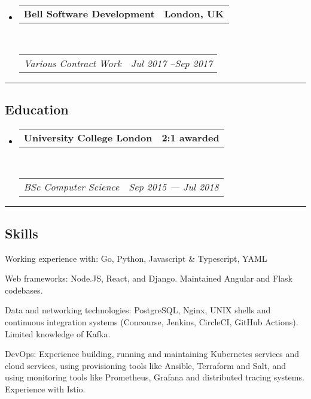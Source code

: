 \documentclass[11pt,a4paper]{article}
\makeatletter
\newenvironment{indentsection}[1]%
{\begin{list}{}%
	{\setlength{\leftmargin}{#1}}%
	\item[]%
}
{\end{list}}
\newenvironment{unindentsection}[1]%
{\begin{list}{}%
	{\setlength{\leftmargin}{-#1}}%
	\item[]%
}
{\end{list}}
\newcommand{\headerrow}[2]
{\begin{tabular*}{\linewidth}{l@{\extracolsep{\fill}}r}
	#1 &
	#2 \\
\end{tabular*}}
\makeatother
\begin{document}
\begin{unindentsection}{1.5em}
\begin{itemize}
 	\item
 	\headerrow%
 		{\textbf{Bell Software Development}}
		{\textbf{London, UK}}
 	\\
 	\headerrow%
 		{\emph{Various Contract Work}}
 		{\emph{Jul 2017 --Sep 2017}}
 \end{itemize}
\end{unindentsection}


 \vspace{-0.4em}
 \hrule
 \vspace{-1.2em}
 \subsection*{Education}

\begin{unindentsection}{1.5em}
\begin{itemize}
	\parskip=0.1em

	\item
	\headerrow%
		{\textbf{University College London}}
		{\textbf{2:1 awarded}}\\
	\headerrow%
		{\emph{BSc Computer Science}}
		{\emph{Sep 2015 --- Jul 2018}}

\end{itemize}
\end{unindentsection}

\vspace{-0.4em}
\hrule
\vspace{-1.2em}

\subsection*{Skills}

\begin{indentsection}{\parindent}
\begin{description*}
	\item[Working experience with:]
	    Go, Python, Javascript \& Typescript, YAML
	\item[Web frameworks:]
	    Node.JS, React, and Django. Maintained Angular and Flask codebases.
	\item[Data and networking technologies:]
	    PostgreSQL, Nginx, UNIX shells and continuous integration systems (Concourse, Jenkins, CircleCI, GitHub Actions). Limited knowledge of Kafka.
	\item[DevOps:]
	    Experience building, running and maintaining Kubernetes
            services and cloud services, using provisioning tools like Ansible,
            Terraform and Salt, and using monitoring tools like Prometheus, Grafana
            and distributed tracing systems. Experience with Istio.
\end{description*}
\end{indentsection}
\end{document}
